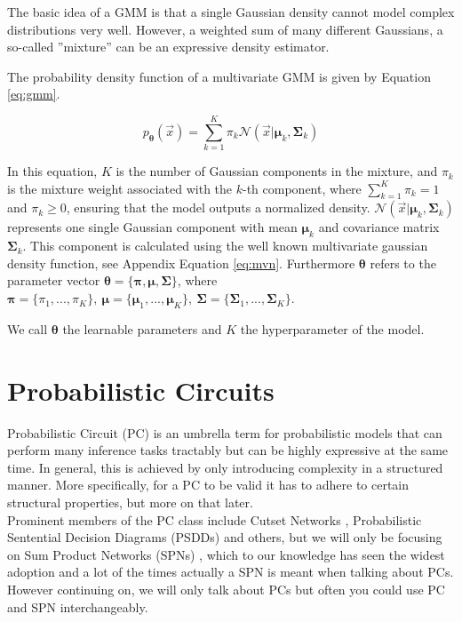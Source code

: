 The basic idea of a GMM is that a single Gaussian density cannot model complex distributions very well.
However, a weighted sum of many different Gaussians, a so-called ''mixture'' can be an expressive density estimator.

The probability density function of a multivariate GMM is given by Equation \ref{eq:gmm}.

\begin{equation}
    p_{\boldsymbol{\theta}}(\vec x) =  \sum_{k=1}^K \pi_k \mathcal{N}(\vec x|\boldsymbol{\mu}_k, \boldsymbol{\Sigma}_k) 
    \label{eq:gmm}
\end{equation}

In this equation, $K$ is the number of Gaussian components in the mixture, and $\pi_k$ is the mixture weight associated with the $k$-th component, where $\sum_{k=1}^K \pi_k = 1$ and $\pi_k \geq 0$, ensuring that the model 
outputs a normalized density. $\mathcal{N}(\vec x|\boldsymbol{\mu}_k, \boldsymbol{\Sigma}_k)$ represents one single Gaussian component with mean $\boldsymbol{\mu}_k$ and 
covariance matrix $\boldsymbol{\Sigma}_k$. This component is calculated using the well known multivariate gaussian density function, see Appendix Equation \ref{eq:mvn}. 
Furthermore $\boldsymbol{\theta}$ refers to the parameter vector $\boldsymbol{\theta} = \{\boldsymbol{\pi}, \boldsymbol{\mu}, \boldsymbol{\Sigma}\}$, where $\boldsymbol{\pi} = \{ \pi_1, ... , \pi_K \}, \ \boldsymbol{\mu} = \{ \boldsymbol{\mu}_1, ... , \boldsymbol{\mu}_K \}, \ \boldsymbol{\Sigma} = \{ \boldsymbol{\Sigma}_1, ... , \boldsymbol{\Sigma}_K \}$.

We call $\boldsymbol{\theta}$ the learnable parameters and $K$ the hyperparameter of the model.

\section{Probabilistic Circuits}
\label{sec:pc}

Probabilistic Circuit (PC) \cite{pc_intro} is an umbrella term for probabilistic models that can perform many inference tasks tractably but can be 
highly expressive at the same time. In general, this is achieved by only introducing complexity in a structured manner. More specifically,
for a PC to be valid it has to adhere to certain structural properties, but more on that later. \\

Prominent members of the PC class include Cutset Networks \cite{cutset}, Probabilistic
Sentential Decision Diagrams (PSDDs) \cite{psdd} and others, but we will only be focusing on Sum Product Networks (SPNs) \cite{spn}, which to our 
knowledge has seen the widest adoption and a lot of the times actually a SPN is meant when talking about PCs. However continuing on, we will only talk about 
PCs but often you could use PC and SPN interchangeably.  

